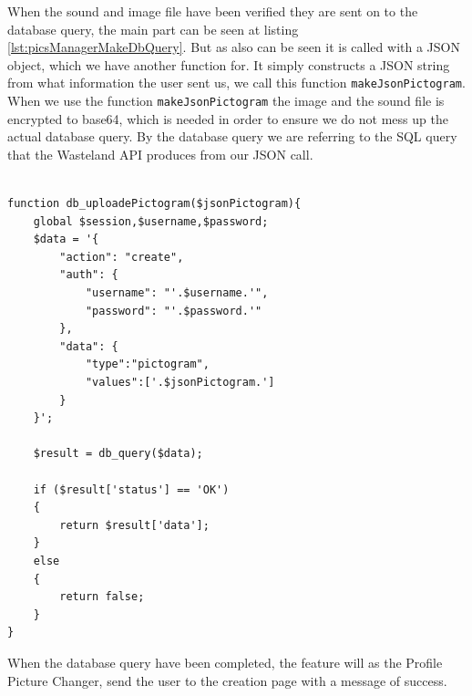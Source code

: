 
When the sound and image file have been verified they are sent on to the database query, the main part can be seen at listing \ref{lst:picsManagerMakeDbQuery}. But as also can be seen it is called with a JSON object, which we have another function for. It simply constructs a JSON string from what information the user sent us, we call this function \texttt{makeJsonPictogram}.\\
When we use the function \texttt{makeJsonPictogram} the image and the sound file is encrypted to base64, which is needed in order to ensure we do not mess up the actual database query. By the database query we are referring to the SQL query that the Wasteland API produces from our JSON call.\\
\\

\lstset{language=PHP}
\begin{lstlisting}[firstline=1,caption={The main part of the DB query for creating Pictograms},label=lst:picsManagerMakeDbQuery]
function db_uploadePictogram($jsonPictogram){
	global $session,$username,$password;
	$data = '{
		"action": "create",
		"auth": {
			"username": "'.$username.'",
			"password": "'.$password.'"
		},
	    "data": {
	    	"type":"pictogram",
	    	"values":['.$jsonPictogram.']
	    }
	}';
	
	$result = db_query($data);

	if ($result['status'] == 'OK')
	{
		return $result['data'];
	}
	else
	{
		return false;
	}
}
\end{lstlisting}

When the database query have been completed, the feature will as the Profile Picture Changer, send the user to the creation page with a message of success.\\
\\